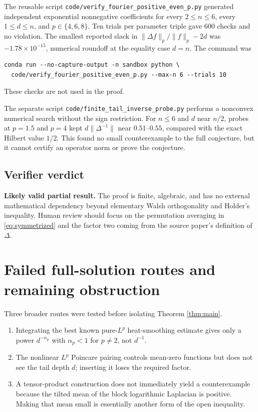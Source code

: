 \documentclass[11pt]{article}
\begin{document}
The reusable script
\texttt{code/verify\_fourier\_positive\_even\_p.py} generated independent
exponential nonnegative coefficients for every $2\le n\le6$, every
$1\le d\le n$, and $p\in\{4,6,8\}$.  Ten trials per parameter triple gave
600 checks and no violation.  The smallest reported slack in
$\|\Delta f\|_p/\|f\|_p-2d$ was $-1.78\times10^{-15}$, numerical roundoff at
the equality case $d=n$.  The command was
\begin{verbatim}
conda run --no-capture-output -n sandbox python \
  code/verify_fourier_positive_even_p.py --max-n 6 --trials 10
\end{verbatim}
These checks are not used in the proof.

The separate script \texttt{code/finite\_tail\_inverse\_probe.py} performs a
nonconvex numerical search without the sign restriction.  For $n\le6$ and
$d$ near $n/2$, probes at $p=1.5$ and $p=4$ kept
$d\|\Delta^{-1}\|$ near $0.51$--$0.55$, compared with the exact Hilbert value
$1/2$.  This found no small counterexample to the full conjecture, but it
cannot certify an operator norm or prove the conjecture.

\subsection*{Verifier verdict}

\textbf{Likely valid partial result.}  The proof is finite, algebraic, and has
no external mathematical dependency beyond elementary Walsh orthogonality and
Holder's inequality.  Human review should focus on the permutation averaging
in \eqref{eq:symmetrized} and the factor two coming from the source paper's
definition of $\Delta$.

\section{Failed full-solution routes and remaining obstruction}

Three broader routes were tested before isolating Theorem \ref{thm:main}.
\begin{enumerate}[leftmargin=*,itemsep=0.4em]
  \item Integrating the best known pure-$L^p$ heat-smoothing estimate gives only
  a power $d^{-\alpha_p}$ with $\alpha_p<1$ for $p\ne2$, not $d^{-1}$.
  \item The nonlinear $L^p$ Poincare pairing controls mean-zero functions but
  does not see the tail depth $d$; inserting it loses the required factor.
  \item A tensor-product construction does not immediately yield a
  counterexample because the tilted mean of the block logarithmic Laplacian is
  positive.  Making that mean small is essentially another form of the open
  inequality.
\end{enumerate}
\end{document}
